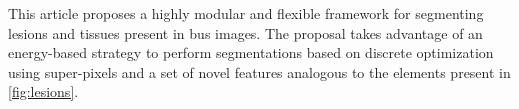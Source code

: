 %

This article proposes a highly modular and flexible framework for segmenting lesions and tissues present in \ac{bus} images.
The proposal takes advantage of an energy-based strategy to perform segmentations based on discrete optimization using super-pixels and a set of novel features analogous to the elements present in \cref{fig:lesions}.

